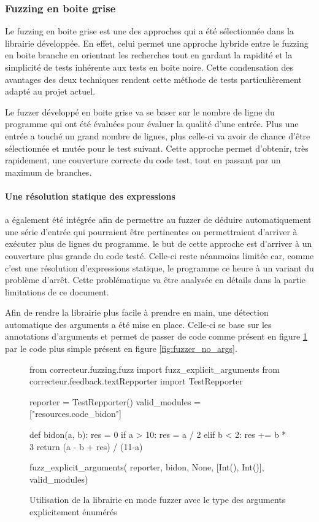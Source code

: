 \documentclass[a4paper]{report}
\begin{document}
\subsubsection{Fuzzing en boite grise}

Le fuzzing en boite grise est une des approches qui a été sélectionnée dans la librairie développée.
En effet, celui permet une approche hybride entre le fuzzing en boite branche en orientant les recherches tout en gardant la rapidité et la simplicité de tests inhérente aux tests en boite noire.
Cette condensation des avantages des deux techniques rendent cette méthode de tests particulièrement adapté au projet actuel.

Le fuzzer développé en boite grise va se baser sur le nombre de ligne du programme qui ont été évaluées pour évaluer la qualité d'une entrée.
Plus une entrée a touché un grand nombre de lignes, plus celle-ci va avoir de chance d'être sélectionnée et mutée  pour le test suivant.
Cette approche permet d'obtenir, très rapidement, une couverture correcte du code test, tout en passant par un maximum de branches.

\paragraph{Une résolution statique des expressions} a également été intégrée afin de permettre au fuzzer de déduire automatiquement une série d'entrée qui pourraient être pertinentes ou permettraient d'arriver à exécuter plus de lignes du programme.
le but de cette approche est d'arriver à un couverture plus grande du code testé.
Celle-ci reste néanmoins limitée car, comme c'est une résolution d'expressions statique, le programme ce heure à un variant du problème d'arrêt.
Cette problématique va être analysée en détails dans la partie limitations de ce document.

Afin de rendre la librairie plus facile à prendre en main, une détection automatique des arguments a été mise en place.
Celle-ci se base sur les annotations d’arguments et permet de passer de code comme présent en figure \ref{fig:fuzzer_args} par le code plus simple présent en figure \ref{fig:fuzzer_no_args}.


\begin{figure}[ht]
\begin{python}
from correcteur.fuzzing.fuzz import fuzz_explicit_arguments
from correcteur.feedback.textRepporter import TestRepporter


reporter = TestRepporter()
valid_modules = ["resources.code_bidon"]

def bidon(a, b):
    res = 0
    if a > 10:
        res = a / 2
    elif b < 2:
        res += b * 3
    return (a - b + res) / (11-a)


fuzz_explicit_arguments(
	reporter,
	bidon,
	None,
	[Int(), Int()],
	valid_modules)
\end{python}
	\caption{Utilisation de la librairie en mode fuzzer avec le type des arguments explicitement énumérés}
	
	\label{fig:fuzzer_args}
\end{figure}
\end{document}
